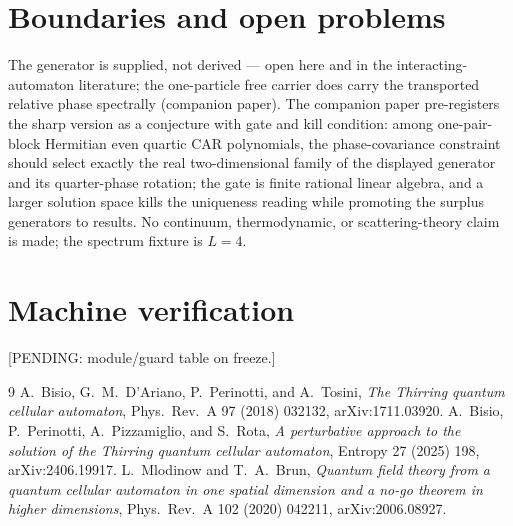 \documentclass[11pt]{article}
\begin{document}
\section{Boundaries and open problems}
The generator is supplied, not derived --- open here and in the
interacting-automaton literature; the one-particle free carrier does
carry the transported relative phase spectrally (companion paper).
The companion paper pre-registers the sharp version as a conjecture
with gate and kill condition: among one-pair-block Hermitian even
quartic CAR polynomials, the phase-covariance constraint should select
exactly the real two-dimensional family of the displayed generator and
its quarter-phase rotation; the gate is finite rational linear algebra,
and a larger solution space kills the uniqueness reading while
promoting the surplus generators to results.
No continuum, thermodynamic, or scattering-theory claim is made; the
spectrum fixture is $L=4$.

\appendix
\section{Machine verification}
[PENDING: module/guard table on freeze.]

\begin{thebibliography}{9}
A.~Bisio, G.~M.~D'Ariano, P.~Perinotti, and A.~Tosini,
\emph{The Thirring quantum cellular automaton},
Phys.\ Rev.\ A 97 (2018) 032132, arXiv:1711.03920.
A.~Bisio, P.~Perinotti, A.~Pizzamiglio, and S.~Rota,
\emph{A perturbative approach to the solution of the Thirring quantum
cellular automaton}, Entropy 27 (2025) 198, arXiv:2406.19917.
L.~Mlodinow and T.~A.~Brun,
\emph{Quantum field theory from a quantum cellular automaton in one
spatial dimension and a no-go theorem in higher dimensions},
Phys.\ Rev.\ A 102 (2020) 042211, arXiv:2006.08927.
\end{thebibliography}
\end{document}
